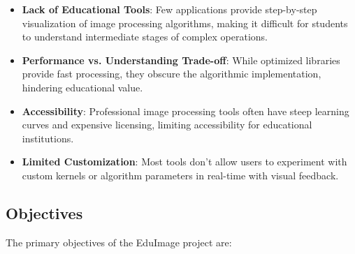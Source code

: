\documentclass[12pt,a4paper]{article}
\begin{document}
\begin{itemize}[leftmargin=*]
    \item \textbf{Lack of Educational Tools}: Few applications provide step-by-step visualization of image processing algorithms, making it difficult for students to understand intermediate stages of complex operations.

    \item \textbf{Performance vs. Understanding Trade-off}: While optimized libraries provide fast processing, they obscure the algorithmic implementation, hindering educational value.

    \item \textbf{Accessibility}: Professional image processing tools often have steep learning curves and expensive licensing, limiting accessibility for educational institutions.

    \item \textbf{Limited Customization}: Most tools don't allow users to experiment with custom kernels or algorithm parameters in real-time with visual feedback.
\end{itemize}

\subsection{Objectives}

The primary objectives of the EduImage project are:
\end{document}

